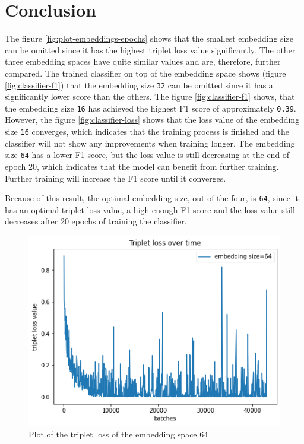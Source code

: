 \documentclass[twocolumn]{article}
\begin{document}
\section{Conclusion}
The figure \ref{fig:plot-embeddings-epochs} shows that the smallest embedding size can be omitted since it has the highest triplet loss value significantly. The other three embedding spaces have quite similar values and are, therefore, further compared. The trained classifier on top of the embedding space shows (figure \ref{fig:classifier-f1}) that the embedding size \texttt{32} can be omitted since it has a significantly lower score than the others. The figure \ref{fig:classifier-f1} shows, that the embedding size \texttt{16} has achieved the highest F1 score of approximately \texttt{0.39}. However, the figure \ref{fig:classifier-loss} shows that the loss value of the embedding size \texttt{16} converges, which indicates that the training process is finished and the classifier will not show any improvements when training longer. The embedding size \texttt{64} has a lower F1 score, but the loss value is still decreasing at the end of epoch 20, which indicates that the model can benefit from further training. Further training will increase the F1 score until it converges.

Because of this result, the optimal embedding size, out of the four, is \texttt{64}, since it has an optimal triplet loss value, a high enough F1 score and the loss value still decreases after 20 epochs of training the classifier.

\begin{figure}[t]
\centering
    \includegraphics[width=\linewidth]{assets/plot_triplet_loss.png}
    \caption{Plot of the triplet loss of the embedding space 64}
    \label{fig:plot-triplet-64}
\end{figure}
\end{document}
